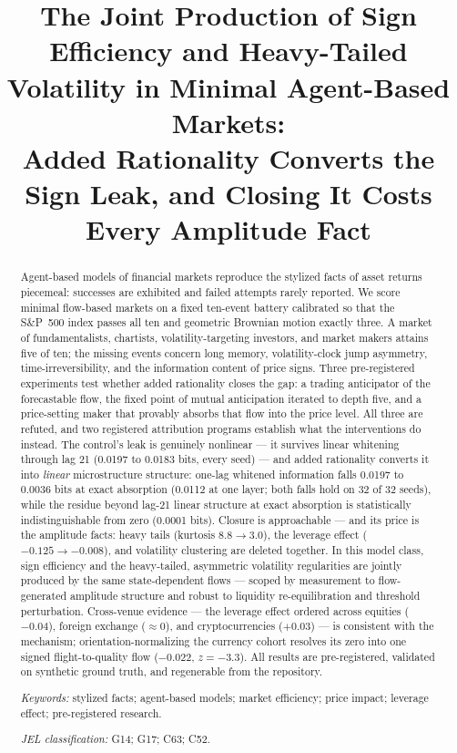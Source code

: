 \documentclass[11pt]{article}
\title{The Joint Production of Sign Efficiency and Heavy-Tailed
Volatility in Minimal Agent-Based Markets:\\
Added Rationality Converts the Sign Leak, and Closing It Costs Every
Amplitude Fact}
\author{}
\date{}
\begin{document}
\maketitle

\begin{abstract}
\noindent
Agent-based models of financial markets reproduce the stylized facts of
asset returns piecemeal: successes are exhibited and failed attempts
rarely reported. We score minimal flow-based markets on a fixed
ten-event battery calibrated so that the S\&P~500 index passes all ten and
geometric Brownian motion exactly three. A market of fundamentalists,
chartists, volatility-targeting investors, and market makers attains five
of ten; the missing events concern long memory, volatility-clock jump
asymmetry, time-irreversibility, and the information content of price
signs. Three pre-registered experiments
test whether added rationality closes the gap: a trading anticipator of
the forecastable flow, the fixed point of mutual anticipation iterated to
depth five, and a price-setting maker that provably absorbs that flow
into the price level. All three are refuted, and two registered attribution programs
establish what the interventions do instead. The control's leak is
genuinely nonlinear --- it survives linear whitening through lag 21
(0.0197 to 0.0183 bits, every seed) --- and added rationality converts
it into \emph{linear} microstructure structure: one-lag whitened
information falls 0.0197 to 0.0036 bits at exact absorption (0.0112 at
one layer; both falls hold on 32 of 32 seeds), while the residue beyond
lag-21 linear structure at exact absorption is statistically
indistinguishable from zero (0.0001 bits). Closure is approachable ---
and its price is the amplitude facts: heavy tails (kurtosis $8.8 \to
3.0$), the leverage effect ($-0.125 \to -0.008$), and volatility
clustering are deleted together. In this model class, sign efficiency and
the heavy-tailed, asymmetric volatility regularities are jointly produced
by the same state-dependent flows --- scoped by measurement to
flow-generated amplitude structure and robust to liquidity
re-equilibration and threshold perturbation. Cross-venue evidence --- the
leverage effect ordered across equities ($-0.04$), foreign exchange
($\approx 0$), and cryptocurrencies ($+0.03$) --- is consistent with the
mechanism; orientation-normalizing the currency cohort resolves its zero
into one signed flight-to-quality flow ($-0.022$, $z = -3.3$). All
results are pre-registered, validated on synthetic ground
truth, and regenerable from the repository.
\par\medskip
\noindent\textit{Keywords:} stylized facts; agent-based models; market
efficiency; price impact; leverage effect; pre-registered research.
\par\smallskip
\noindent\textit{JEL classification:} G14; G17; C63; C52.
\end{abstract}
\end{document}
